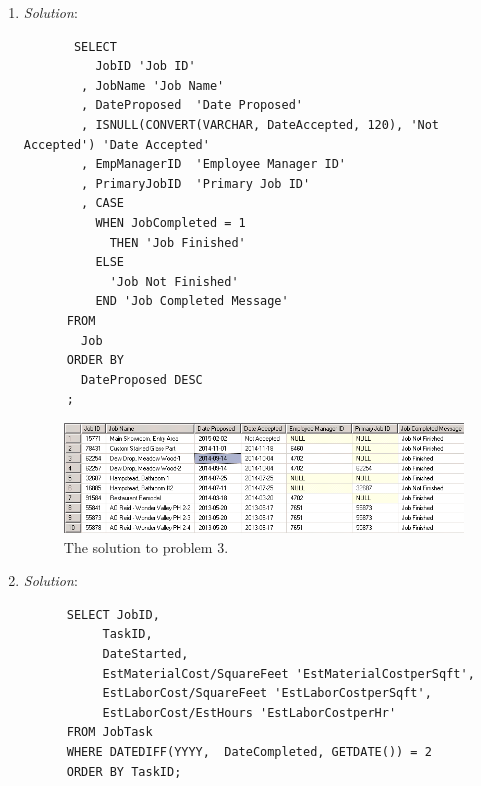 \documentclass{article}
\begin{document}
\begin{enumerate}
  \newpage
  \item %

  \textit{Solution}:
  \begin{verbatim}
       SELECT
          JobID 'Job ID'
        , JobName 'Job Name'
        , DateProposed  'Date Proposed'
        , ISNULL(CONVERT(VARCHAR, DateAccepted, 120), 'Not Accepted') 'Date Accepted'
        , EmpManagerID  'Employee Manager ID'
        , PrimaryJobID  'Primary Job ID'
        , CASE
          WHEN JobCompleted = 1
            THEN 'Job Finished'
          ELSE
            'Job Not Finished'
          END 'Job Completed Message'
      FROM
        Job
      ORDER BY
        DateProposed DESC
      ;
  \end{verbatim}

  \begin{figure}[h!]
    \centering
    \includegraphics[width=.95\linewidth]{QueryResults/HW04_Problem03_query}
    \caption{The solution to problem 3.}
    \label{fig:HW04_Problem03_query}
  \end{figure}

  \newpage
  \item %
  \textit{Solution}:
  \begin{verbatim}
      SELECT JobID,
           TaskID,
           DateStarted,
           EstMaterialCost/SquareFeet 'EstMaterialCostperSqft',
           EstLaborCost/SquareFeet 'EstLaborCostperSqft',
           EstLaborCost/EstHours 'EstLaborCostperHr'
      FROM JobTask
      WHERE DATEDIFF(YYYY,  DateCompleted, GETDATE()) = 2
      ORDER BY TaskID;
  \end{verbatim}


\end{enumerate}
\end{document}
